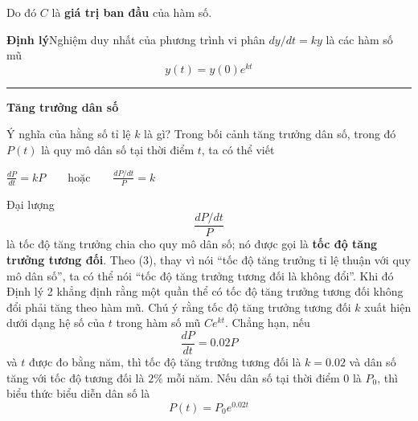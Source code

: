 \noindent
\begin{minipage}[t]{135pt}
    \vspace{0pt}
\end{minipage}%
\hspace{18pt}%
\begin{minipage}[t]{387pt}
    \vspace{0pt}
    Do đó $C$ là \textbf{giá trị ban đầu} của hàm số.

    \vspace{0.2em}
    \begin{theorembox}
        \noindent{}\hspace{0.6em}\textcolor{stewartred}{\textbf{\textsf{Định lý}}}\hspace{0.8em}Nghiệm duy nhất của phương trình vi phân $dy/dt = ky$ là các hàm số mũ
        \[
            y(t) = y(0)e^{kt}
        \]
    \end{theorembox}

    \vspace{0.4em}
    \noindent\textcolor{stewartcyan}{\rule[0.05em]{1.1ex}{1.1ex}}\hspace{0.5em}\textbf{\textsf{\large Tăng trưởng dân số}}

    \vspace{0.1em}
    Ý nghĩa của hằng số tỉ lệ $k$ là gì? Trong bối cảnh tăng trưởng dân số, trong đó $P(t)$ là quy mô dân số tại thời điểm $t$, ta có thể viết

    \vspace{0.2em}
    \noindent{}\hfill $\displaystyle \frac{dP}{dt} = kP \qquad \text{hoặc} \qquad \frac{dP/dt}{P} = k$\hfill\null
    \vspace{0.2em}

    Đại lượng
    \[
        \frac{dP/dt}{P}
    \]
    là tốc độ tăng trưởng chia cho quy mô dân số; nó được gọi là \textbf{tốc độ tăng trưởng tương đối}. Theo (3), thay vì nói ``tốc độ tăng trưởng tỉ lệ thuận với quy mô dân số'', ta có thể nói ``tốc độ tăng trưởng tương đối là không đổi''. Khi đó Định lý 2 khẳng định rằng một quần thể có tốc độ tăng trưởng tương đối không đổi phải tăng theo hàm mũ. Chú ý rằng tốc độ tăng trưởng tương đối $k$ xuất hiện dưới dạng hệ số của $t$ trong hàm số mũ $Ce^{kt}$. Chẳng hạn, nếu
    \[
        \frac{dP}{dt} = 0.02P
    \]
    và $t$ được đo bằng năm, thì tốc độ tăng trưởng tương đối là $k = 0.02$ và dân số tăng với tốc độ tương đối là $2\%$ mỗi năm. Nếu dân số tại thời điểm $0$ là $P_0$, thì biểu thức biểu diễn dân số là
    \[
        P(t) = P_0 e^{0.02t}
    \]


\end{minipage}
